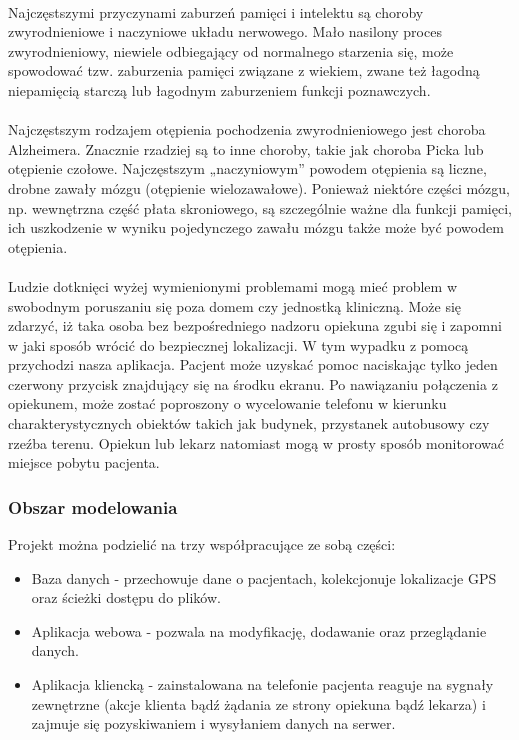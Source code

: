 \documentclass[11pt,a4paper]{article}
\begin{document}
\\
 Najczęstszymi przyczynami zaburzeń pamięci i intelektu są choroby zwyrodnieniowe i naczyniowe układu nerwowego. Mało nasilony proces zwyrodnieniowy, niewiele odbiegający od normalnego starzenia się, może spowodować tzw. zaburzenia pamięci związane z wiekiem, zwane też łagodną niepamięcią starczą lub łagodnym zaburzeniem funkcji poznawczych.\\
\\
 Najczęstszym rodzajem otępienia pochodzenia zwyrodnieniowego jest choroba Alzheimera. Znacznie rzadziej są to inne choroby, takie jak choroba Picka lub otępienie czołowe. Najczęstszym „naczyniowym” powodem otępienia są liczne, drobne zawały mózgu (otępienie wielozawałowe). Ponieważ niektóre części mózgu, np. wewnętrzna część płata skroniowego, są szczególnie ważne dla funkcji pamięci, ich uszkodzenie w wyniku pojedynczego zawału mózgu także może być powodem otępienia.\\
\\
 Ludzie dotknięci wyżej wymienionymi problemami mogą mieć problem w swobodnym poruszaniu się poza domem czy jednostką kliniczną. Może się zdarzyć, iż taka osoba bez bezpośredniego nadzoru opiekuna zgubi się i zapomni w jaki sposób wrócić do bezpiecznej lokalizacji. W tym wypadku z pomocą przychodzi nasza aplikacja. Pacjent może uzyskać pomoc naciskając tylko jeden czerwony przycisk znajdujący się na środku ekranu. Po nawiązaniu połączenia z opiekunem, może zostać poproszony o wycelowanie telefonu w kierunku charakterystycznych obiektów takich jak budynek, przystanek autobusowy czy rzeźba terenu. Opiekun lub lekarz natomiast mogą w prosty sposób monitorować miejsce pobytu pacjenta. 

\subsubsection {Obszar modelowania}

Projekt można podzielić na trzy współpracujące ze sobą części:
\begin{itemize}
\item Baza danych - przechowuje dane o pacjentach, kolekcjonuje lokalizacje GPS oraz ścieżki dostępu do plików.
\item Aplikacja webowa - pozwala na modyfikację, dodawanie oraz przeglądanie danych.
\item Aplikacja kliencką - zainstalowana na telefonie pacjenta reaguje na sygnały zewnętrzne (akcje klienta bądź żądania ze strony opiekuna bądź lekarza) i zajmuje się pozyskiwaniem i wysyłaniem danych na serwer.
\end{itemize}
\end{document}
